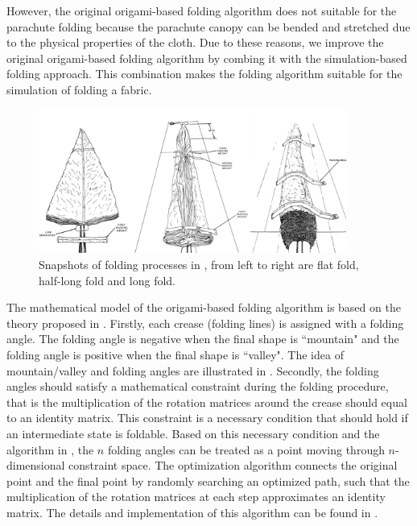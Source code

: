 However, the original origami-based folding algorithm does not suitable for the parachute folding because the parachute canopy can be bended and stretched due to the physical properties of the cloth. Due to these reasons, we improve the original origami-based folding algorithm \cite{Xi2014Folding} by combing it with the simulation-based folding approach. This combination makes the folding algorithm suitable for the simulation of folding a fabric.

\begin{figure}\centering
\includegraphics[width=0.9\textwidth]{Figures/folding_process.png}
\caption{Snapshots of folding processes in \cite{T10-manual}, from left to right are flat fold, half-long fold and long fold.\label{fig:folding_process}}
\end{figure}
The mathematical model of the origami-based folding algorithm is based on the theory proposed in \cite{Hull2002Mathematical}. Firstly, each crease (folding lines) is assigned with a folding angle. The folding angle is negative when the final shape is ``mountain" and the folding angle is positive when the final shape is ``valley". The idea of mountain/valley and folding angles are illustrated in . Secondly, the folding angles should satisfy a mathematical constraint during the folding procedure, that is the multiplication of the rotation matrices around the crease should equal to an identity matrix. This constraint is a necessary condition that should hold if an intermediate state is foldable. Based on this necessary condition and the algorithm in \cite{Xi2014Folding}, the $n$ folding angles can be treated as a point moving through $n$-dimensional constraint space. The optimization algorithm connects the original point and the final point by randomly searching an optimized path, such that the multiplication of the rotation matrices at each step approximates an identity matrix. The details and implementation of this algorithm can be found in \cite{Xi2014Folding}.

